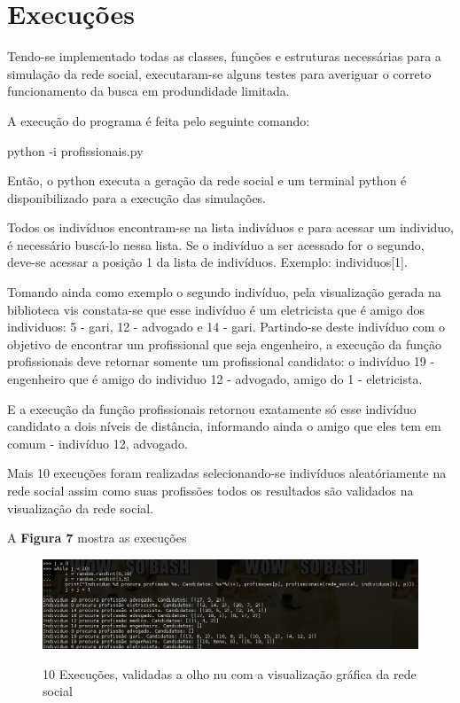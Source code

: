 
\section{Execuções}\label{sec:execucoes}    %

Tendo-se implementado todas as classes, funções e estruturas necessárias para a simulação da rede social, executaram-se alguns testes para averiguar o correto funcionamento da busca em produndidade limitada.

A execução do programa é feita pelo seguinte comando:

{\tiny python -i profissionais.py}

Então, o python executa a geração da rede social e um terminal python é disponibilizado para a execução das simulações.

Todos os indivíduos encontram-se na lista indivíduos e para acessar um individuo, é necessário buscá-lo nessa lista. Se o indivíduo a ser acessado for o segundo, deve-se acessar a posição 1 da lista de indivíduos. Exemplo: individuos[1].

Tomando ainda como exemplo o segundo indivíduo, pela visualização gerada na biblioteca vis constata-se que esse indivíduo é um eletricista que é amigo dos individuos: 5 - gari, 12 - advogado e 14 - gari. Partindo-se deste indivíduo com o objetivo de encontrar um profissional que seja engenheiro, a execução da função profissionais deve retornar somente um profissional candidato: o indivíduo 19 - engenheiro que é amigo do individuo 12 - advogado, amigo do 1 - eletricista.

E a execução da função profissionais retornou exatamente só esse indivíduo candidato a dois níveis de distância, informando ainda o amigo que eles tem em comum - indivíduo 12, advogado.

Mais 10 execuções foram realizadas selecionando-se indivíduos aleatóriamente na rede social assim como suas profissões todos os resultados são validados na visualização da rede social.

A \textbf{Figura 7} mostra as execuções

\begin{figure}
        \centering
        \caption{10 Execuções, validadas a olho nu com a visualização gráfica da rede social}
        \includegraphics[scale=0.4]{./02-figuras/execucoes.png}
        \label{fig:execucoes}
\end{figure}
